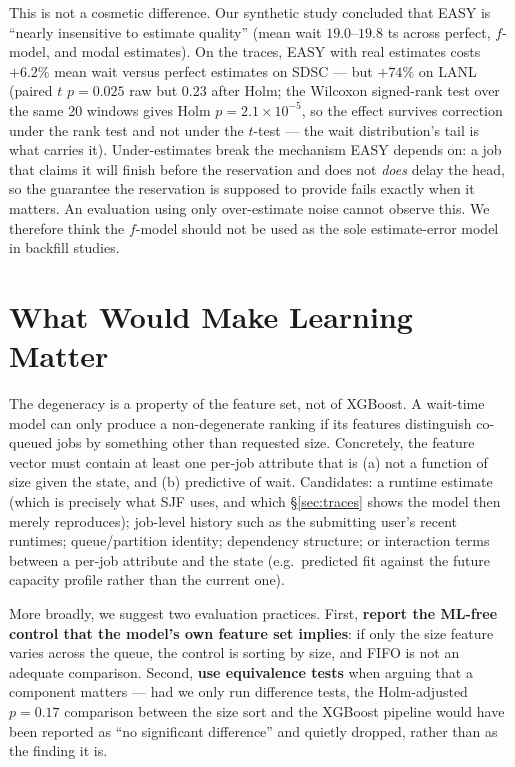 \documentclass[11pt,twocolumn]{article}
\begin{document}
This is not a cosmetic difference. Our synthetic study concluded that EASY is
``nearly insensitive to estimate quality'' (mean wait $19.0$--$19.8$ ts across
perfect, $f$-model, and modal estimates). On the traces, EASY with real
estimates costs $+6.2\%$ mean wait versus perfect estimates on SDSC --- but
$+74\%$ on LANL (paired $t$ $p = 0.025$ raw but $0.23$ after Holm; the Wilcoxon
signed-rank test over the same 20 windows gives Holm $p = 2.1 \times 10^{-5}$, so the
effect survives correction under the rank test and not under the $t$-test --- the
wait distribution's tail is what carries it). Under-estimates break the mechanism EASY depends
on: a job that claims it will finish before the reservation and does not
\emph{does} delay the head, so the guarantee the reservation is supposed to
provide fails exactly when it matters. An evaluation using only over-estimate
noise cannot observe this. We therefore think the $f$-model should not be used
as the sole estimate-error model in backfill studies.

\section{What Would Make Learning Matter}
\label{sec:fix}

The degeneracy is a property of the feature set, not of XGBoost. A wait-time
model can only produce a non-degenerate ranking if its features distinguish
co-queued jobs by something other than requested size. Concretely, the feature
vector must contain at least one per-job attribute that is (a) not a function of
size given the state, and (b) predictive of wait. Candidates: a runtime estimate
(which is precisely what SJF uses, and which \S\ref{sec:traces} shows the model
then merely reproduces); job-level history such as the submitting user's recent
runtimes; queue/partition identity; dependency structure; or interaction terms
between a per-job attribute and the state (e.g.\ predicted fit against the
future capacity profile rather than the current one).

More broadly, we suggest two evaluation practices. First, \textbf{report the
ML-free control that the model's own feature set implies}: if only the size
feature varies across the queue, the control is sorting by size, and FIFO is not
an adequate comparison. Second, \textbf{use equivalence tests} when arguing that
a component matters --- had we only run difference tests, the Holm-adjusted
$p = 0.17$ comparison between the size sort and the XGBoost pipeline would have
been reported as ``no significant difference'' and quietly dropped, rather than
as the finding it is.
\end{document}
